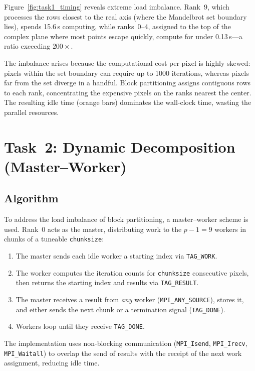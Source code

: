 \documentclass[11pt,a4paper]{article}
\begin{document}
Figure~\ref{fig:task1_timing} reveals extreme load imbalance. Rank~9,
which processes the rows closest to the real axis (where the Mandelbrot set
boundary lies), spends 15.6\,s computing, while ranks~0--4, assigned to the
top of the complex plane where most points escape quickly, compute for under
0.13\,s---a ratio exceeding $200\times$.

The imbalance arises because the computational cost per pixel is highly
skewed: pixels within the set boundary can require up to 1000 iterations,
whereas pixels far from the set diverge in a handful. Block partitioning
assigns contiguous rows to each rank, concentrating the expensive pixels on
the ranks nearest the center. The resulting idle time (orange bars)
dominates the wall-clock time, wasting the parallel resources.


\section{Task~2: Dynamic Decomposition (Master--Worker)}

\subsection{Algorithm}

To address the load imbalance of block partitioning, a master--worker scheme
is used. Rank~0 acts as the master, distributing work to the $p{-}1 = 9$
workers in chunks of a tuneable \texttt{chunksize}:

\begin{enumerate}\itemsep0pt
\item The master sends each idle worker a starting index via \texttt{TAG\_WORK}.
\item The worker computes the iteration counts for \texttt{chunksize}
      consecutive pixels, then returns the starting index and results via
      \texttt{TAG\_RESULT}.
\item The master receives a result from \emph{any} worker
      (\texttt{MPI\_ANY\_SOURCE}), stores it, and either sends the next
      chunk or a termination signal (\texttt{TAG\_DONE}).
\item Workers loop until they receive \texttt{TAG\_DONE}.
\end{enumerate}

The implementation uses non-blocking communication (\texttt{MPI\_Isend},
\texttt{MPI\_Irecv}, \texttt{MPI\_Waitall}) to overlap the send of results
with the receipt of the next work assignment, reducing idle time.
\end{document}
